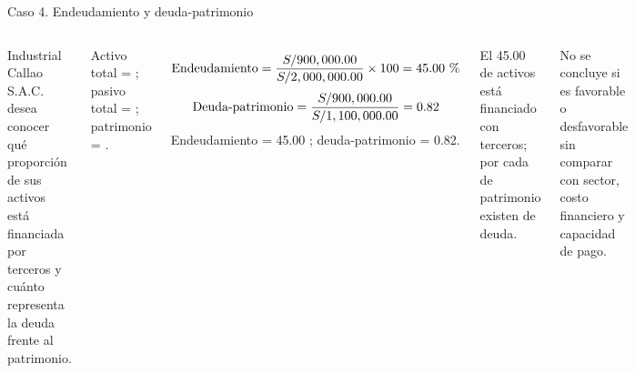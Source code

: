 \begin{frame}{Caso 4. Endeudamiento y deuda-patrimonio}
\smallcase
\begin{columns}[T,totalwidth=\textwidth]
 Industrial Callao S.A.C. desea conocer qué proporción de sus activos está financiada por terceros y cuánto representa la deuda frente al patrimonio.

 Activo total = ; pasivo total = ; patrimonio = .

\[
\text{Endeudamiento}=\frac{\soles{900,000.00}}{\soles{2,000,000.00}}\times100=45.00\text{ \pct}
\]
\[
\text{Deuda-patrimonio}=\frac{S/ 900,000.00}{S/ 1,100,000.00}=0.82
\]
 Endeudamiento = 45.00 \pct; deuda-patrimonio = 0.82.

 El 45.00 \pct{} de activos está financiado con terceros; por cada  de patrimonio existen  de deuda.

\centering
{}
\vspace{1em}

\scriptsize No se concluye si es favorable o desfavorable sin comparar con sector, costo financiero y capacidad de pago.
\end{columns}
\end{frame}
